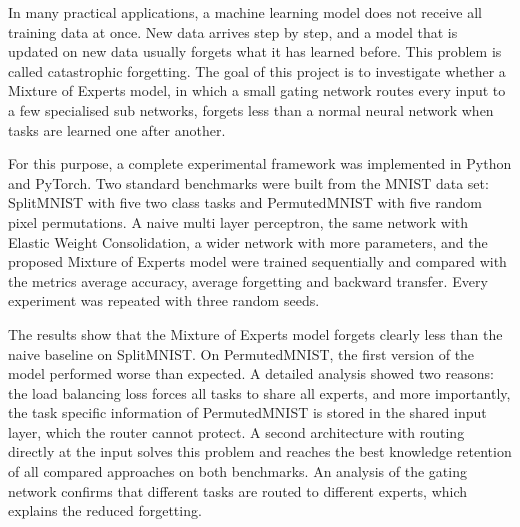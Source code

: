 In many practical applications, a machine learning model does not receive
all training data at once. New data arrives step by step, and a model that
is updated on new data usually forgets what it has learned before. This
problem is called catastrophic forgetting. The goal of this project is to
investigate whether a Mixture of Experts model, in which a small gating
network routes every input to a few specialised sub networks, forgets less
than a normal neural network when tasks are learned one after another.

For this purpose, a complete experimental framework was implemented in
Python and PyTorch. Two standard benchmarks were built from the MNIST data
set: SplitMNIST with five two class tasks and PermutedMNIST with five
random pixel permutations. A naive multi layer perceptron, the same network
with Elastic Weight Consolidation, a wider network with more parameters,
and the proposed Mixture of Experts model were trained sequentially and
compared with the metrics average accuracy, average forgetting and backward
transfer. Every experiment was repeated with three random seeds.

The results show that the Mixture of Experts model forgets clearly less
than the naive baseline on SplitMNIST. On PermutedMNIST, the first version
of the model performed worse than expected. A detailed analysis showed two
reasons: the load balancing loss forces all tasks to share all experts, and
more importantly, the task specific information of PermutedMNIST is stored
in the shared input layer, which the router cannot protect. A second
architecture with routing directly at the input solves this problem and
reaches the best knowledge retention of all compared approaches on both
benchmarks. An analysis of the gating network confirms that different tasks
are routed to different experts, which explains the reduced forgetting.
